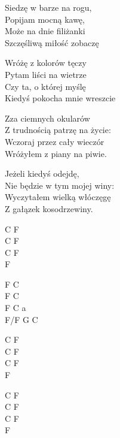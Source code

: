 \begin{text}
    Siedzę w barze na rogu,\\
    Popijam mocną kawę,\\
    Może na dnie filiżanki\\
    Szczęśliwą miłość zobaczę

    \vin Wróżę z kolorów tęczy\\
    \vin Pytam liści na wietrze\\
    \vin Czy ta, o której myślę\\
    \vin Kiedyś pokocha mnie wreszcie

    Zza ciemnych okularów\\
    Z trudnością patrzę na życie:\\
    Wczoraj przez cały wieczór\\
    Wróżyłem z piany na piwie.

    Jeżeli kiedyś odejdę,\\
    Nie będzie w tym mojej winy:\\
    Wyczytałem wielką włóczęgę\\
    Z gałązek kosodrzewiny.
\end{text}
\begin{chord}
    C F\\
    C F\\
    C F\\
    F

    F C\\
    F C\\
    F C a\\
    F/F G C

    C F\\
    C F\\
    C F\\
    F

    C F\\
    C F\\
    C F\\
    F
\end{chord}
